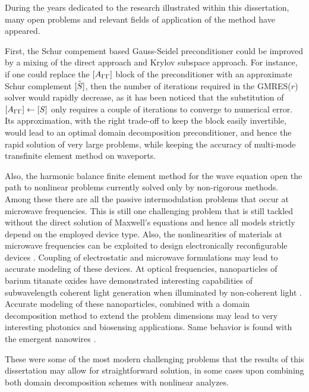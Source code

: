 During the years dedicated to the research illustrated within this dissertation, many open problems and relevant fields of application of the method have appeared.

First, the Schur compement based Gauss-Seidel preconditioner could be improved by a mixing of the direct approach and Krylov subspace approach. For instance, if one could replace the $\left[A_{\Gamma\Gamma}\right]$ block of the preconditioner with an approximate Schur complement $\tilde{\left[S\right]}$, then the number of iterations required in the GMRES($r$) solver would rapidly decrease, as it has been noticed that the substitution of $\left[A_{\Gamma\Gamma}\right] \leftarrow \left[S\right]$ only requires a couple of iterations to converge to numerical error. Its approximation, with the right trade-off to keep the block easily invertible, would lead to an optimal domain decomposition preconditioner, and hence the rapid solution of very large problems, while keeping the accuracy of multi-mode transfinite element method on waveports.

Also, the harmonic balance finite element method for the wave equation open the path to nonlinear problems currently solved only by non-rigorous methods. Among these there are all the passive intermodulation problems that occur at microwave frequencies. This is still one challenging problem that is still tackled without the direct solution of Maxwell's equations \cite{henrie2008prediction,lin2014design} and hence all models strictly depend on the employed device type. Also, the nonlinearities of materials at microwave frequencies can be exploited to design electronically reconfigurable devices \cite{Sigman2008, Zhang2008, Delprat2011}. Coupling of electrostatic and microwave formulations may lead to accurate modeling of these devices. At optical frequencies, nanoparticles of barium titanate oxides have demonstrated interesting capabilities of subwavelength coherent light generation when illuminated by non-coherent light \cite{pu2010nonlinear}. Accurate modeling of these nanoparticles, combined with a domain decomposition method to extend the problem dimensions may lead to very interesting photonics and biosensing applications. Same behavior is found with the emergent nanowires \cite{dutto2011nonlinear}.

These were some of the most modern challenging problems that the results of this dissertation may allow for straightforward solution, in some cases upon combining both domain decomposition schemes with nonlinear analyzes.
\thispagestyle{empty}
\cleardoublepage


\hypertarget{tocpage}{}





%


